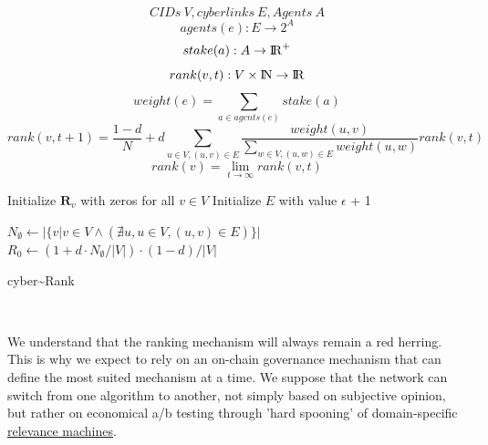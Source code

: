 \documentclass[8pt,oneside]{amsart}
\begin{document}
$$ CIDs \ V, cyberlinks \ E, Agents \ A $$
$$agents(e): E \rightarrow 2^{A}$$
$$stake(a): A \rightarrow {\rm I\!R}^+ $$
$$rank(v, t): V \times {\rm I\!N} \rightarrow {\rm I\!R} $$
$$weight(e) = \sum\limits_{a \in agents(e)}{stake(a)}$$
$$rank(v, t + 1) = \frac{1 - d}{N} + d\sum\limits_{u \in V, (u, v) \in E}{\frac{weight(u, v)}{\sum_{w \in V, (u, w) \in E}{weight(u, w)}}rank(v, t)} $$
$$rank(v) = \lim\limits_{t \rightarrow \infty} rank(v, t)$$
\begin{algorithm}


\BlankLine
Initialize $\textbf{R}_{v}$ with zeros for all $v \in V$\;
Initialize $E$ with value $\epsilon$ + 1\;

\BlankLine
$N_{\emptyset} \leftarrow |\{v|v \in V \land (\nexists u, u \in V, (u, v) \in E )\}|$ \;
$R_{0} \leftarrow (1 + d \cdot N_{\emptyset} / |V|) \cdot (1 - d) / |V| $ \;

\BlankLine
{}

\caption{cyber\~{}Rank}\label{algo_disjdecomp}
\end{algorithm}\

We understand that the ranking mechanism will always remain a red herring. This is why we expect to rely on an on-chain governance mechanism that can define the most suited mechanism at a time. We suppose that the network can switch from one algorithm to another, not simply based on subjective opinion, but rather on economical a/b testing through 'hard spooning' of domain-specific {\hyperref[relevance-machine]{relevance machines}}.
\end{document}

